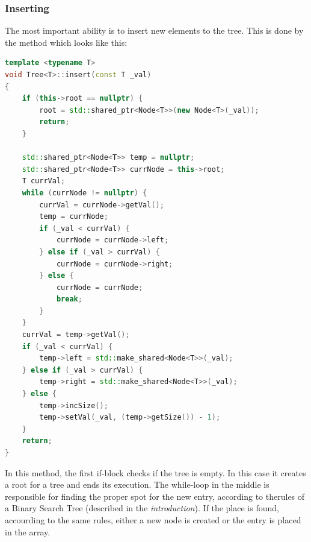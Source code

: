 \documentclass[12pt]{article}
\begin{document}
\subsubsection{Inserting}
The most important ability is to insert new elements to the tree. This is done by the method which looks like this:
\begin{footnotesize}
\begin{lstlisting}[language=C++]
template <typename T>
void Tree<T>::insert(const T _val)
{
    if (this->root == nullptr) {
        root = std::shared_ptr<Node<T>>(new Node<T>(_val));
        return;
    }

    std::shared_ptr<Node<T>> temp = nullptr;
    std::shared_ptr<Node<T>> currNode = this->root;
    T currVal;
    while (currNode != nullptr) {
        currVal = currNode->getVal();
        temp = currNode;
        if (_val < currVal) {
            currNode = currNode->left;
        } else if (_val > currVal) {
            currNode = currNode->right;
        } else {
            currNode = currNode;
            break;
        }
    }
    currVal = temp->getVal();
    if (_val < currVal) {
        temp->left = std::make_shared<Node<T>>(_val);
    } else if (_val > currVal) {
        temp->right = std::make_shared<Node<T>>(_val);
    } else {
        temp->incSize();
        temp->setVal(_val, (temp->getSize()) - 1);
    }
    return;
}
\end{lstlisting}
\end{footnotesize}

In this method, the first if-block checks if the tree is empty. In this case it creates a root for a tree and ends its execution. The while-loop in the middle is responsible for finding the proper spot for the new entry, according to therules of a Binary Search Tree (described in the \textit{introduction}). If the place is found, accourding to the same rules, either a new node is created or the entry is placed in the array.

\pagebreak
\end{document}
